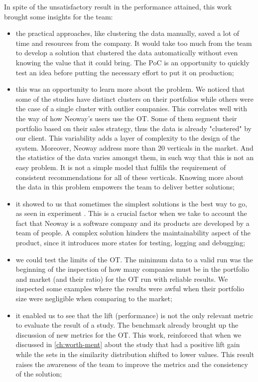 In spite of the unsatisfactory result in the performance attained, this work brought some insights for the team:
\begin{itemize}
    \item the practical approaches, like clustering the data manually, saved a lot of time and resources from the company. It would take too much from the team to develop a solution that clustered the data automatically without even knowing the value that it could bring. The PoC is an opportunity to quickly test an idea before putting the necessary effort to put it on production;
    \item this was an opportunity to learn more about the problem. We noticed that some of the studies have distinct clusters on their portfolios while others were the case of a single cluster with outlier companies. This correlates well with the way of how Neoway's users use the OT. Some of them segment their portfolio based on their sales strategy, thus the data is already "clustered" by our client. This variability adds a layer of complexity to the design of the system. Moreover, Neoway address more than 20 verticals in the market. And the statistics of the data varies amongst them, in such way that this is not an easy problem. It is not a simple model that fulfils the requirement of consistent recommendations for all of these verticals. Knowing more about the data in this problem empowers the team to deliver better solutions;
    \item it showed to us that sometimes the simplest solutions is the best way to go, as seen in experiment \nameExperimentII{}. This is a crucial factor when we take to account the fact that Neoway is a software company and its products are developed by a team of people. A complex solution hinders the maintainability aspect of the product, since it introduces more states for testing, logging and debugging;
    \item we could test the limits of the OT. The minimum data to a valid run was the beginning of the inspection of how many companies must be in the portfolio and market (and their ratio) for the OT run with reliable results. We inspected some examples where the results were awful when their portfolio size were negligible when comparing to the market;
    \item it enabled us to see that the lift (performance) is not the only relevant metric to evaluate the result of a study. The benchmark already brought up the discussion of new metrics for the OT. This work, reinforced that when we discussed in \ref{ch:worth-ment} about the study that had a positive lift gain while the sets in the similarity distribution shifted to lower values. This result raises the awareness of the team to improve the metrics and the consistency of the solution;
\end{itemize}


